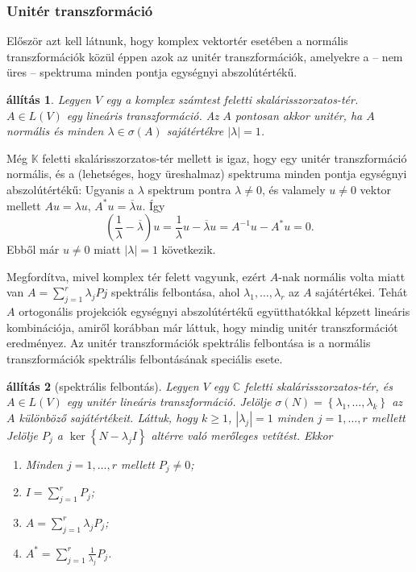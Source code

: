 \documentclass[9pt, a4paper, showtrims]{memoir}
\makeatletter
\renewenvironment{proof}[1][\proofname]
    {\par\pushQED{\qed}%
    \normalfont \topsep6\p@\@plus6\p@\relax
    \trivlist
    \item[\hskip\labelsep
        \itshape
    #1\@addpunct{:}]\ignorespaces}
    {\popQED\endtrivlist\@endpefalse}
\theoremstyle{plain}
\newtheorem{proposition}{állítás}[chapter]
\theoremstyle{remark}
\theoremstyle{definition}
\makeatother
\begin{document}
\subsubsection{Unitér transzformáció}
Először azt kell látnunk,
hogy komplex vektortér esetében a normális transzformációk közül éppen azok az unitér transzformációk,
amelyekre a -- nem üres -- spektruma minden pontja egységnyi abszolútértékű.
\begin{proposition}
	Legyen $V$ egy a komplex számtest feletti skalárisszorzatos-tér.
	$A\in L\left( V \right)$ egy lineáris transzformáció.
	Az $A$ pontosan akkor unitér, ha $A$ normális és minden $\lambda\in\sigma\left( A \right)$ sajátértékre
	$|\lambda|=1$.
\end{proposition}
\begin{proof}
	Még $\mathbb{K}$ feletti skalárisszorzatos-tér mellett is igaz,
	hogy egy unitér transzformáció normális,
	és a (lehetséges, hogy üreshalmaz) spektruma minden pontja egységnyi abszolútértékű:
	Ugyanis a $\lambda$ spektrum pontra $\lambda\neq 0$,
	és valamely $u\neq 0$ vektor mellett
	$Au=\lambda u$, $A^\ast u=\overline{\lambda}u$. Így
	\[
		\left( \frac{1}{\lambda}-\overline{\lambda} \right)u
		=
		\frac{1}{\lambda}u-\overline{\lambda}u
		=
		A^{-1}u-A^\ast u
		=0.
	\]
	Ebből már
	$u\neq 0$ miatt $|\lambda|=1$ következik.

	Megfordítva,
	mivel komplex tér felett vagyunk,
	ezért $A$-nak normális volta miatt van
	$A=\sum_{j=1}^r\lambda_jPj$ spektrális felbontása,
	ahol $\lambda_1,\ldots,\lambda_r$ az $A$ sajátértékei.
	Tehát $A$ ortogonális projekciók egységnyi abszolútértékű együtthatókkal képzett lineáris kombinációja,
	amiről korábban már láttuk, hogy mindig unitér transzformációt eredményez.
\end{proof}
Az unitér transzformációk spektrális felbontása is
a normális transzformációk spektrális felbontásának speciális esete.
\begin{proposition}[spektrális felbontás]
	Legyen $V$ egy $\mathbb{C}$ feletti skalárisszorzatos-tér, és $A\in L\left( V \right)$
	egy unitér lineáris transzformáció.
	Jelölje $\sigma\left( N \right)=\left\{\lambda_1,\ldots,\lambda_k  \right\}$ az $A$ különböző sajátértékeit.
	Láttuk, hogy $k\geq 1$, $|\lambda_j|=1$ minden $j=1,\ldots,r$ mellett
	Jelölje $P_j$ a $\ker\left\{ N-\lambda_jI \right\}$ altérre való merőleges vetítést.
	Ekkor
	\begin{enumerate}
		\item Minden $j=1,\ldots,r$ mellett $P_j\neq 0$;
		\item $I=\sum_{j=1}^rP_j$;
		\item $A=\sum_{j=1}^r\lambda_jP_j$;
		\item $A^\ast=\sum_{j=1}^r\frac{1}{\lambda_j}P_j$.
		      \qedhere
	\end{enumerate}
\end{proposition}
\end{document}

